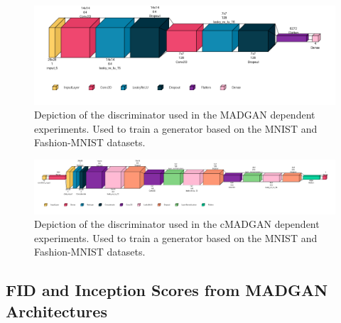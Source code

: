 \begin{figure}[htbp]
    \centering
    \vspace{-2em}
    \includegraphics[width=.9\textwidth]{abb/netron_network_archs/define_madgan_mnists_disc.png}
    \caption{Depiction of the discriminator used in the MADGAN dependent experiments. Used to train a generator based on the MNIST and Fashion-MNIST datasets.}
    \label{fig:figure_disc_arch_madgan}
\end{figure}

\begin{figure}[htbp]
    \centering
    \vspace{-2em}
    \includegraphics[width=.9\textwidth]{abb/netron_network_archs/define_cmadgan_mnists_disc.png}
    \caption{Depiction of the discriminator used in the cMADGAN dependent experiments. Used to train a generator based on the MNIST and Fashion-MNIST datasets.}
    \label{fig:figure_disc_arch_cmadgan}
\end{figure}

\newpage


\subsection{FID and Inception Scores from MADGAN Architectures}

